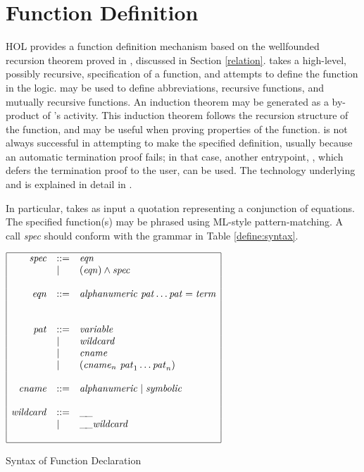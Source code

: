 \section{Function Definition}\label{TFL}

HOL{} provides a function definition mechanism based on the
wellfounded recursion theorem proved in ,
discussed in Section \ref{relation}.   takes a high-level,
possibly recursive, specification of a function, and attempts to
define the function in the logic.  may be used to define
abbreviations, recursive functions, and mutually recursive
functions. An induction theorem may be generated as a by-product of
's activity. This induction theorem follows the recursion
structure of the function, and may be useful when proving properties
of the function.  is not always successful in attempting
to make the specified definition, usually because an automatic
termination proof fails; in that case, another entrypoint, ,
which defers the termination proof to the user, can be used.
The technology underlying  and  is explained
in detail in \cite{slind-thesis}.



 In particular,  takes as input a quotation representing a
conjunction of equations. The specified function(s) may be phrased
using ML-style pattern-matching. A call 
\textit{spec} should conform with the grammar in Table
\ref{define:syntax}.
\begin{table}[htbp]
\begin{center}
$
\begin{array}{|rll|}
\hline
\mathit{spec} & ::= &  \mathit{eqn} \\
              & \mid  & (\mathit{eqn}) \land \mathit{spec} \\
  & & \\ 
\mathit{eqn} & ::= & \mathit{alphanumeric}\ \mathit{pat} \ldots \mathit{pat} = \mathit{term} \\
  & & \\ 
  & & \\ 
\mathit{pat} & ::= & \mathit{variable} \\
    & \mid   & \mathit{wildcard} \\
    & \mid   & \mathit{cname} \\
    & \mid   & (\mathit{cname}_n\ \mathit{pat}_1 \ldots \mathit{pat}_n) \\
  & & \\ 
\mathit{cname} & ::= & \mathit{alphanumeric} \mid \mathit{symbolic} \\
  & & \\ 
\mathit{wildcard} & ::=  & \_\!\_ \\
                  & \mid & \_\!\_ \mathit{wildcard} \\
  & & \\ 
\hline
\end{array}
$
\caption{Syntax of Function Declaration}\label{define:syntax}
\end{center}
\end{table}

